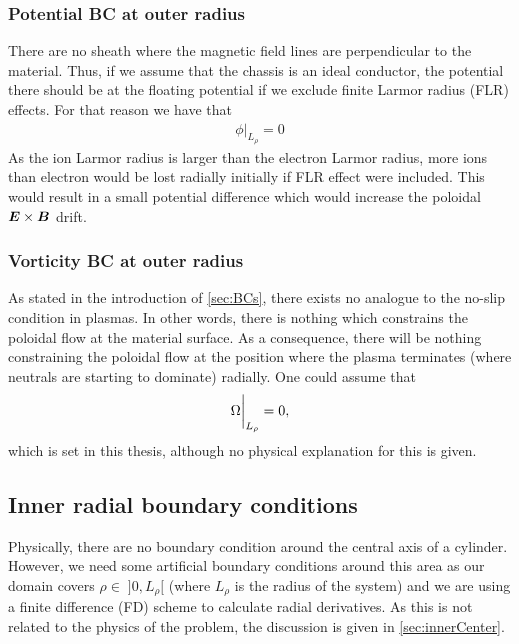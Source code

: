 \subsubsection{Potential BC at outer radius}
%
There are no sheath where the magnetic field lines are perpendicular to the material.
Thus, if we assume that the chassis is an ideal conductor, the potential there should be at the floating potential if we exclude finite Larmor radius (FLR) effects.
For that reason we have that
%
\begin{align*}
    \phi \bigg|_{L_\rho} = 0
\end{align*}
%
As the ion Larmor radius is larger than the electron Larmor radius, more ions than electron would be lost radially initially if FLR effect were included.
This would result in a small potential difference which would increase the poloidal $\boldsymbol{E}\times\boldsymbol{B}$ drift.

\subsubsection{Vorticity BC at outer radius}
%
As stated in the introduction of \cref{sec:BCs}, there exists no analogue to the no-slip condition in plasmas.
In other words, there is nothing which constrains the poloidal flow at the material surface.
As a consequence, there will be nothing constraining the poloidal flow at the position where the plasma terminates (where neutrals are starting to dominate) radially.
One could assume that
%
\begin{align*}
    \Omega \bigg|_{L_\rho} = 0,
\end{align*}
%
which is set in this thesis, although no physical explanation for this is given.

\subsection{Inner radial boundary conditions}
\label{sec:BCInnerRho}
%
Physically, there are no boundary condition around the central axis of a cylinder.
However, we need some artificial boundary conditions around this area as our domain covers $\rho \in \; ]0, L_\rho[$ (where $L_\rho$ is the radius of the system) and we are using a finite difference (FD) scheme to calculate radial derivatives.
As this is not related to the physics of the problem, the discussion is given in \cref{sec:innerCenter}.
